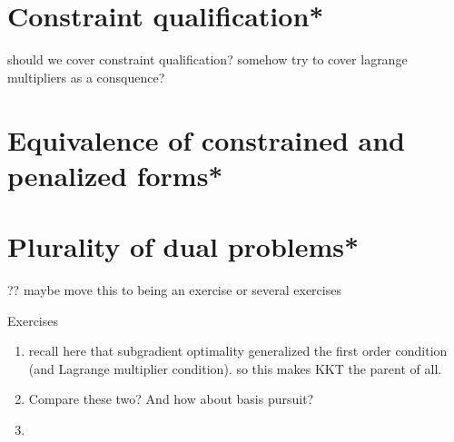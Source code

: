 \section{Constraint qualification*}

should we cover constraint qualification? 
somehow try to cover lagrange multipliers as a consquence?

\section{Equivalence of constrained and penalized forms*}

\section{Plurality of dual problems*}
\label{sec:plurality_dual_problems}

?? maybe move this to being an exercise or several exercises

\begin{xcb}{Exercises}
\begin{enumerate}[label=\thechapter.\arabic*]
\settowidth{\leftmargini}{00.00.\hskip\labelsep}
\item \label{ex:kkt_subgradient_constrained}
recall here that subgradient optimality generalized the first order condition
(and Lagrange multiplier condition). so this makes KKT the parent of all. 

\item \label{ex:lasso_dantzig}
Compare these two? And how about basis pursuit?

\item \label{ex:simplex_projection}

\end{enumerate}
\end{xcb}